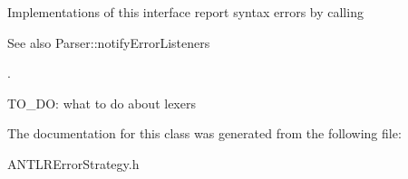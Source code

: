 Implementations of this interface report syntax errors by calling \begin{DoxySeeAlso}{See also}
Parser\+::notify\+Error\+Listeners


\end{DoxySeeAlso}
. 

T\+O\+\_\+\+DO\+: what to do about lexers 

The documentation for this class was generated from the following file\+:\begin{DoxyCompactItemize}
\item 
A\+N\+T\+L\+R\+Error\+Strategy.\+h\end{DoxyCompactItemize}
